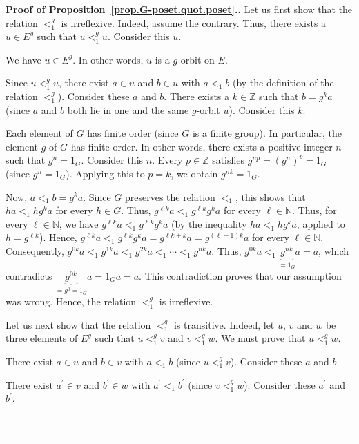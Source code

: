 \documentclass[numbers=enddot,12pt,final,onecolumn,notitlepage,abstracton]{scrartcl}
\theoremstyle{definition}
\newenvironment{proof}[1][Proof]{\noindent\textbf{#1.} }{\ \rule{0.5em}{0.5em}}
\newenvironment{verlong}{}{}
\newenvironment{vershort}{}{}
\newcommand{\NN}{{\mathbb{N}}}
\newcommand{\ZZ}{{\mathbb{Z}}}
\begin{document}
\begin{proof}[Proof of Proposition~\ref{prop.G-poset.quot.poset}.]
Let us first show that the relation $<_{1}^{g}$ is irreflexive.
Indeed, assume the contrary. Thus, there exists a $u \in E^g$
such that $u <_1^g u$. Consider this $u$.

We have $u \in E^g$. In other words, $u$ is a $g$-orbit on $E$.

Since $u<_{1}^{g}u$, there exist $a\in u$ and $b\in u$ with
$a<_{1}b$ (by the definition of the relation $<_{1}^{g}$).
Consider these $a$ and $b$. There exists a $k\in\mathbb{Z}$ such
that $b=g^{k}a$ (since $a$ and $b$ both lie in one and the same $g$-orbit
$u$). Consider this $k$.

Each element of $G$ has finite order (since $G$ is a finite group).
In particular, the element $g$ of $G$ has finite order. In other words,
there exists a positive integer $n$ such that $g^{n}=1_G$.
Consider this $n$. Every $p \in \ZZ$ satisfies $g^{np}=\left(
g^{n}\right)  ^{p}=1_G$ (since $g^{n}=1_G$).
Applying this to $p=k$, we obtain $g^{nk}=1_G$.

Now, $a<_{1}b=g^{k}a$. Since $G$ preserves the relation $<_{1}$, this shows
that $ha<_{1}hg^{k}a$ for every $h\in G$.
\begin{vershort}
Thus, $g^{\ell k}a<_{1}g^{\ell k}g^{k}a$ for every $\ell\in \NN $.
\end{vershort}
\begin{verlong}
Thus, for every $\ell \in \NN$, we have
$g^{\ell k}a<_{1}g^{\ell k}g^{k}a$ (by the inequality $ha <_1 h g^k a$,
applied to $h = g^{\ell k}$).
\end{verlong}
Hence,
$g^{\ell k} a <_{1} g^{\ell k} g^{k} a
= g^{\ell k + k} a = g^{\left(  \ell+1\right)  k} a$
for every $\ell\in \NN $.
Consequently, $g^{0k}a<_{1}g^{1k}a<_{1}g^{2k}a<_{1}\cdots<_{1}g^{nk}a$. Thus,
$g^{0k}a<_{1}\underbrace{g^{nk}}_{=1_G}a=a$, which
contradicts $\underbrace{g^{0k}}_{=g^0=1_G}a=1_Ga=a$.
This contradiction proves that our assumption was
wrong. Hence, the relation $<_{1}^{g}$ is irreflexive.

Let us next show that the relation $<_{1}^{g}$ is transitive. Indeed, let $u$,
$v$ and $w$ be three elements of $E^{g}$ such that $u<_{1}^{g}v$ and
$v<_{1}^{g}w$. We must prove that $u<_{1}^{g}w$.

There exist $a\in u$ and $b\in v$ with $a<_{1}b$ (since $u<_{1}^{g}v$).
Consider these $a$ and $b$.

There exist $a^{\prime}\in v$ and $b^{\prime}\in w$ with $a^{\prime}
<_{1}b^{\prime}$ (since $v<_{1}^{g}w$). Consider these $a^{\prime}$ and
$b^{\prime}$.


\end{proof}
\end{document}
